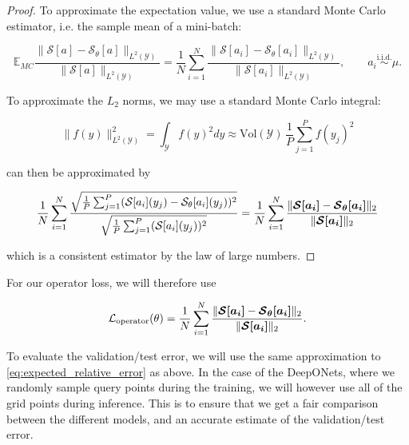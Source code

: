 \begin{proof}
    To approximate the expectation value, we use a standard Monte Carlo estimator, i.e. the sample mean of a mini-batch:

    \begin{equation}
        \mathbb{E}_{MC}\frac{\|\mathcal{S}[a]-\mathcal{S}_\theta[a]\|_{L^2(\mathcal{Y})}}{\|\mathcal{S}[a]\|_{L^2(\mathcal{Y})}} = \frac{1}{N} \sum_{i=1}^{N} \frac{\|\mathcal{S}[a_i]-\mathcal{S}_\theta[a_i]\|_{L^2(\mathcal{Y})}}{\|\mathcal{S}[a_i]\|_{L^2(\mathcal{Y})}}, 
        \qquad a_i \overset{\text{i.i.d.}}{\sim} \mu.
    \end{equation}

    To approximate the \(L_2\) norms, we may use a standard Monte Carlo integral:

    \begin{equation}
        \|f(y)\|_{L^2(\mathcal{Y})}^2 = \int_{\mathcal{Y}} f(y)^2 dy \approx \text{Vol}(\mathcal{Y}) \, \frac{1}{P} \sum_{j=1}^{P} f(y_j)^2
    \end{equation}

     can then be approximated by
    
    \begin{equation}
        \frac{1}{N} \sum_{i=1}^{N} \frac{\sqrt{\frac{1}{P} \sum_{j=1}^{P}  (\mathcal{S}[a_i](y_j)-\mathcal{S}_\theta[a_i](y_j))^2}}{\sqrt{\frac{1}{P} \sum_{j=1}^{P} (\mathcal{S}[a_i](y_j))^2}}
        = \frac{1}{N} \sum_{i=1}^{N} \frac{\|\bm{\mathcal{S}[a_i]}- \bm{\mathcal{S}_\theta[a_i]}\|_2}{\|\bm{\mathcal{S}[a_i]}\|_2}
    \end{equation}

which is a consistent estimator by the law of large numbers.
\end{proof}

For our operator loss, we will therefore use

\begin{equation}
    \mathcal{L}_{\text{operator}}(\theta)=\frac{1}{N} \sum_{i=1}^{N} \frac{\|\bm{\mathcal{S}[a_i]}- \bm{\mathcal{S}_\theta[a_i]}\|_2}{\|\bm{\mathcal{S}[a_i]}\|_2}.
    \label{loss}
\end{equation}

To evaluate the validation/test error, we will use the same approximation to \ref{eq:expected_relative_error} as above. In the case of the DeepONets, where we randomly sample query points during the training, 
we will however use all of the grid points during inference. This is to ensure that we get a fair comparison between the different models, and an accurate estimate of the validation/test error.

